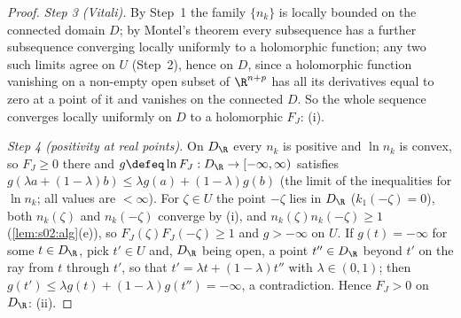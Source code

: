 \begin{proof}
\emph{Step 3 (Vitali).} By Step~1 the family $\{n_k\}$ is locally bounded on the connected domain $D$; by Montel's theorem every subsequence has a further subsequence converging locally uniformly to a holomorphic function; any two such limits agree on $U$ (Step~2), hence on $D$, since a holomorphic function vanishing on a non-empty open subset of $\R^{n+p}$ has all its derivatives equal to zero at a point of it and vanishes on the connected $D$. So the whole sequence converges locally uniformly on $D$ to a holomorphic $F_J$: (i).

\emph{Step 4 (positivity at real points).} On $D_\R$ every $n_k$ is positive and $\ln n_k$ is convex, so $F_J\ge0$ there and $g\defeq\ln F_J:D_\R\to[-\infty,\infty)$ satisfies $g(\lambda a+(1-\lambda)b)\le\lambda g(a)+(1-\lambda)g(b)$ (the limit of the inequalities for $\ln n_k$; all values are $<\infty$). For $\zeta\in U$ the point $-\zeta$ lies in $D_\R$ ($k_1(-\zeta)=0$), both $n_k(\zeta)$ and $n_k(-\zeta)$ converge by (i), and $n_k(\zeta)n_k(-\zeta)\ge1$ (\cref{lem:s02:alg}(e)), so $F_J(\zeta)F_J(-\zeta)\ge1$ and $g>-\infty$ on $U$. If $g(t)=-\infty$ for some $t\in D_\R$, pick $t'\in U$ and, $D_\R$ being open, a point $t''\in D_\R$ beyond $t'$ on the ray from $t$ through $t'$, so that $t'=\lambda t+(1-\lambda)t''$ with $\lambda\in(0,1)$; then $g(t')\le\lambda g(t)+(1-\lambda)g(t'')=-\infty$, a contradiction. Hence $F_J>0$ on $D_\R$: (ii).
\end{proof}

